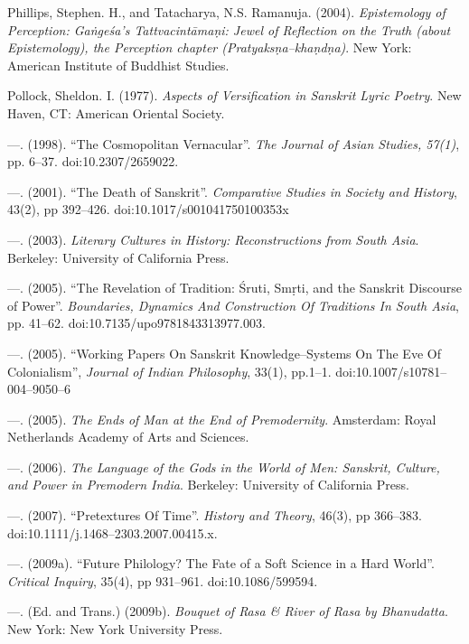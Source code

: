 \begin{thebibliography}{99}
  Phillips, Stephen. H., and Tatacharya, N.S. Ramanuja. (2004). \textit{Epistemology of Perception: Gaṅgeśa's Tattvacintāmaṇi: Jewel of Reflection on the Truth (about Epistemology), the Perception chapter (Pratyaksṇa–khaṇdṇa)}. New York: American Institute of Buddhist Studies.

  Pollock, Sheldon. I. (1977). \textit{Aspects of Versification in Sanskrit Lyric Poetry}. New Haven, CT: American Oriental Society.

  —. (1998). “The Cosmopolitan Vernacular”. \textit{The Journal of Asian Studies, 57(1)}, pp. 6–37. doi:10.2307/2659022.

  —. (2001). “The Death of Sanskrit”. \textit{Comparative Studies in Society and History}, 43(2), pp 392–426. doi:10.1017/s001041750100353x

  —. (2003). \textit{Literary Cultures in History: Reconstructions from South Asia}. Berkeley: University of California Press.

  —. (2005). “The Revelation of Tradition: Śruti, Smṛti, and the Sanskrit Discourse of Power”. \textit{Boundaries, Dynamics And Construction Of Traditions In South Asia}, pp. 41–62. doi:10.7135/upo9781843313977.003.

  —. (2005). “Working Papers On Sanskrit Knowledge–Systems On The Eve Of Colonialism”, \textit{Journal of Indian Philosophy}, 33(1), pp.1–1. doi:10.1007/s10781–004–9050–6

  —. (2005). \textit{The Ends of Man at the End of Premodernity}. Amsterdam: Royal Netherlands Academy of Arts and Sciences.

  —. (2006). \textit{The Language of the Gods in the World of Men: Sanskrit, Culture, and Power in Premodern India}. Berkeley: University of California Press.

  —. (2007). “Pretextures Of Time”. \textit{History and Theory}, 46(3), pp 366–383. doi:10.1111/j.1468–2303.2007.00415.x.

  —. (2009a). “Future Philology? The Fate of a Soft Science in a Hard World”. \textit{Critical Inquiry}, 35(4), pp 931–961. doi:10.1086/599594.

  —. (Ed. and Trans.) (2009b). \textit{Bouquet of Rasa \& River of Rasa by Bhanudatta}. New York: New York University Press.


\end{thebibliography}
